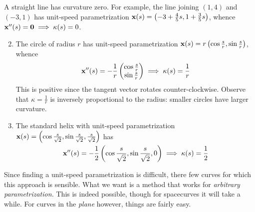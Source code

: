 \begin{examples}{}{}
	\exstart A straight line has curvature zero. For example, the line joining $(1,4)$ and $(-3,1)$ has unit-speed parametrization ${\mathbf{x}}(s)=\bigl(-3+\frac 45s,1+\frac 35s\bigr)$, whence ${\mathbf{x}}''(s)=\mathbf{0}\implies \kappa(s)=0$.

	\begin{enumerate}\setcounter{enumi}{1}
	  \item The circle of radius $r$ has unit-speed parametrization ${\mathbf{x}}(s)=r\left(\cos\frac sr,\sin\frac sr\right)$, whence
	  \[
	  	{\mathbf{x}}''(s)=-\frac 1r\begin{pmatrix}\cos\frac sr\\\sin\frac sr\end{pmatrix}\implies \kappa(s)=\frac 1r
	  \]
	  This is positive since the tangent vector rotates counter-clockwise. Observe that $\kappa=\frac 1r$ is inversely proportional to the radius: smaller circles have larger curvature.
	    
	  \item The standard helix with unit-speed parametrization ${\mathbf{x}}(s)=\smash[b]{\left(\cos\frac s{\sqrt 2},\sin\frac s{\sqrt 2},\frac s{\sqrt 2}\right)}$ has
	  \[
	  	{\mathbf{x}}''(s)=-\frac 12\left(\cos\frac s{\sqrt 2},\sin\frac s{\sqrt 2},0\right)\implies \kappa(s)=\frac 12
	  \]
	  
	\end{enumerate}
\end{examples}

Since finding a unit-speed parametrization is difficult, there few curves for which this approach is sensible. What we want is a method that works for \emph{arbitrary parametrization.} This is indeed possible, though for spacecurves it will take a while. For curves in the \emph{plane} however, things are fairly easy.



